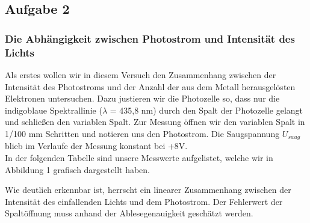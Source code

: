 \subsection{Aufgabe 2}
\subsubsection{Die Abhängigkeit zwischen Photostrom und Intensität des Lichts}
Als erstes wollen wir in diesem Versuch den Zusammenhang zwischen der Intensität des Photostroms und der Anzahl der aus dem Metall herausgelösten Elektronen untersuchen. Dazu justieren wir die Photozelle so, dass nur die indigoblaue Spektrallinie (\(\lambda\) = 435,8 nm) durch den Spalt der Photozelle gelangt und schließen den variablen Spalt. Zur Messung öffnen wir den variablen Spalt in 1/100 mm Schritten und notieren uns den Photostrom. Die Saugspannung \(U_{saug}\) blieb im Verlaufe der Messung konstant bei +8V.\\
In der folgenden Tabelle sind unsere Messwerte aufgelistet, welche wir in Abbildung 1 grafisch dargestellt haben.\\

\begin{center}

\end{center}

\begin{center}
\begin{minipage}{\linewidth}
\centering
{}
\label{ips}
\end{minipage}
\end{center}

Wie deutlich erkennbar ist, herrscht ein linearer Zusammenhang zwischen der Intensität des einfallenden Lichts und dem Photostrom. Der Fehlerwert der Spaltöffnung muss anhand der Ablesegenauigkeit geschätzt werden.

